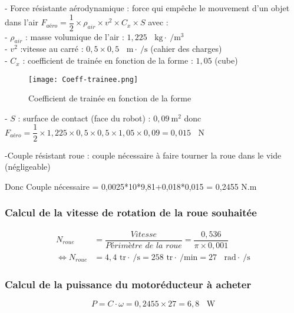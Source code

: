 \documentclass[12pt,a4paper]{article}
\begin{document}
- Force résistante aérodynamique : force qui empêche le mouvement d'un objet dans l'air $F_{\textit{aéro}} = \dfrac{1}{2} \times \rho_{air} \times v^2 \times C_x \times S$ avec :\\
\indent \indent - $\rho_{air}$ : masse volumique de l'air : $1,225 \text{ }\SI{}{\kilogram}\cdot\SI{}{\per\meter\cubed}$\\
\indent \indent - $v^2$ :vitesse au carré : $0,5\times 0,5 \text{ }\SI{}{\meter} \cdot \SI{}{\per\second}$ (cahier des charges)\\
\indent \indent - $C_x$ : coefficient de trainée en fonction de la forme : $1,05$ (cube)
	\begin{figure}[ht!]
		\centering
			\texttt{[image: Coeff-trainee.png]}
			\caption[Coefficient de trainée en fonction de la forme - Illustration du domaine public provenant de l'encyclopédie en ligne Wikipédia, disponible à l'adresse : \url{https://commons.wikimedia.org/wiki/File:Drag-fr.svg}]{Coefficient de trainée en fonction de la forme\label{overflow}}
	\end{figure}
	
\indent \indent - $S$ : surface de contact (face du robot) : $0,09 \SI{}{\meter\squared}$ 
donc $F_{\textit{aéro}} = \dfrac{1}{2} \times 1,225 \times 0,5 \times 0,5 \times 1,05 \times 0,09 = 0,015 \text{ } \SI{}{\newton}$
	
-Couple résistant roue : couple nécessaire à faire tourner la roue dans le vide (négligeable)
 
Donc Couple nécessaire = 0,0025*10*9,81+0,018*0,015 = 0,2455 N.m

\subsubsection{Calcul de la vitesse de rotation de la roue souhaitée}
\begin{align*}
N_{roue} &= \dfrac{Vitesse}{\textit{Périmètre de la roue}} = \dfrac{0,536}{\pi \times 0,001}\\
\Leftrightarrow N_{roue} &= 4,4 \text{ tr}\cdot\SI{}{\per\second} = 258 \text{ tr} \cdot \SI{}{\per\minute} = 27 \text{ } \SI{}{\radian} \cdot \SI{}{\per\second}
\end{align*}

\subsubsection{Calcul de la puissance du motoréducteur à acheter}
$$P = C \cdot \omega = 0,2455 \times 27 = 6,8 \text{ } \SI{}{\watt}$$
\end{document}
